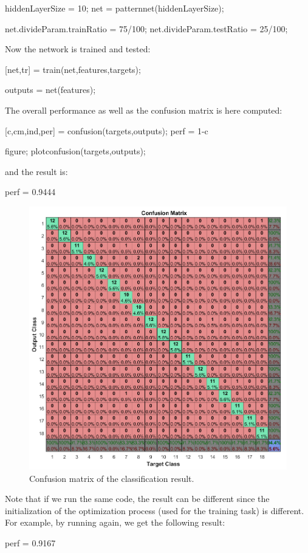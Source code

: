 \begin{matlab}
hiddenLayerSize = 10;
net = patternnet(hiddenLayerSize);

net.divideParam.trainRatio = 75/100;
net.divideParam.testRatio  = 25/100;
\end{matlab}

Now the network is trained and tested:

\begin{matlab}
[net,tr] = train(net,features,targets);

outputs = net(features);
\end{matlab}

The overall performance as well as the confusion matrix is here computed:

\begin{matlab}
[c,cm,ind,per] = confusion(targets,outputs);
perf = 1-c

figure; plotconfusion(targets,outputs);
\end{matlab}

and the result is:
\begin{mwindow}
perf =  0.9444
\end{mwindow}

\begin{figure}[htbp]
\centering
\includegraphics[width=\linewidth]{confusion.png}
\caption{Confusion matrix of the classification result.}
 \label{fig:machine_learning:matlab:confusion}
\end{figure}

Note that if we run the same code, the result can be different since the initialization of the optimization process (used for the training task) is different.\\
For example, by running again, we get the following result:
\begin{mwindow}
perf =  0.9167
\end{mwindow}
